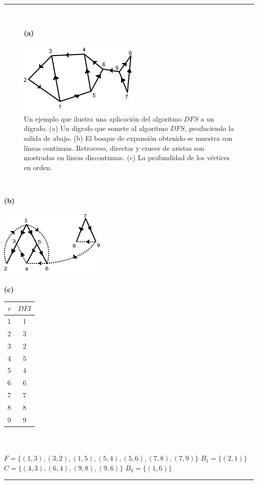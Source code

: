 \documentclass[10pt,a5paper]{book}
\begin{document}
\hrule
\vfill
\begin{figure}[H]
\caption{Un ejemplo que ilustra una aplicación del algoritmo $DFS$ a un dígrafo. (a) Un dígrafo que somete al algoritmo $DFS$, produciendo la salida de abajo. (b) El bosque de expansión obtenido se muestra con líneas continuas. Retroceso, directas y cruces de aristas son mostradas en líneas discontinuas. (c) La profundidad de los vértices en orden.}
\hrulefill{}\\
\begin{flushleft}\textbf{(a)}\end{flushleft}
\centering
\includegraphics[scale=0.7]{Fig1_17_a.png}
\end{figure}
\hrulefill{}\\
\parbox{6cm}
{
  \begin{flushleft}\textbf{(b)}\end{flushleft}
  \includegraphics[scale=0.6]{Fig1_17_b.png}
}\parbox{4cm}
{
  \begin{flushleft}\textbf{(c)}\end{flushleft}
  \begin{tabular}{|r|c|}
  \hline
  $v$ & $DFI$ \\
  \hline
  1 & 1 \\
  \hline
  2 & 3 \\
  \hline
  3 & 2 \\
  \hline
  4 & 5 \\
  \hline
  5 & 4 \\
  \hline
  6 & 6 \\
  \hline
  7 & 7 \\
  \hline
  8 & 8 \\
  \hline
  9 & 9 \\
  \hline
\end{tabular}
}\\
\\$F = \{(1,3),(3,2),(1,5),(5,4),(5,6),(7,8),(7,9)\}$ \quad $B_1 = \{(2,1)\}$ 
$C = \{(4,3),(6,4),(9,8),(9,6)\}$ \quad $B_2 = \{(1,6)\}$\\
\hrule
\end{document}
